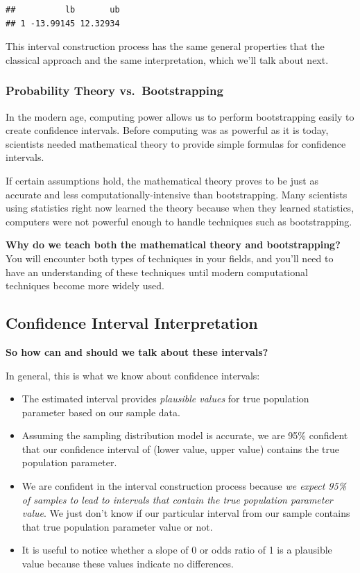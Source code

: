 \documentclass[
]{book}
\providecommand{\tightlist}{%
  \setlength{\itemsep}{0pt}\setlength{\parskip}{0pt}}
\begin{document}
\begin{verbatim}
##          lb       ub
## 1 -13.99145 12.32934
\end{verbatim}

This interval construction process has the same general properties that the classical approach and the same interpretation, which we'll talk about next.

\subsubsection{Probability Theory vs.~Bootstrapping}\label{probability-theory-vs.-bootstrapping}

In the modern age, computing power allows us to perform bootstrapping easily to create confidence intervals. Before computing was as powerful as it is today, scientists needed mathematical theory to provide simple formulas for confidence intervals.

If certain assumptions hold, the mathematical theory proves to be just as accurate and less computationally-intensive than bootstrapping. Many scientists using statistics right now learned the theory because when they learned statistics, computers were not powerful enough to handle techniques such as bootstrapping.

\textbf{Why do we teach both the mathematical theory and bootstrapping?} You will encounter both types of techniques in your fields, and you'll need to have an understanding of these techniques until modern computational techniques become more widely used.

\subsection{Confidence Interval Interpretation}\label{confidence-interval-interpretation}

\textbf{So how can and should we talk about these intervals?}

In general, this is what we know about confidence intervals:

\begin{itemize}
\tightlist
\item
  The estimated interval provides \emph{plausible values} for true population parameter based on our sample data.
\item
  Assuming the sampling distribution model is accurate, we are 95\% confident that our confidence interval of (lower value, upper value) contains the true population parameter.
\item
  We are confident in the interval construction process because \emph{we expect 95\% of samples to lead to intervals that contain the true population parameter value}. We just don't know if our particular interval from our sample contains that true population parameter value or not.
\item
  It is useful to notice whether a slope of 0 or odds ratio of 1 is a plausible value because these values indicate no differences.
\end{itemize}
\end{document}
